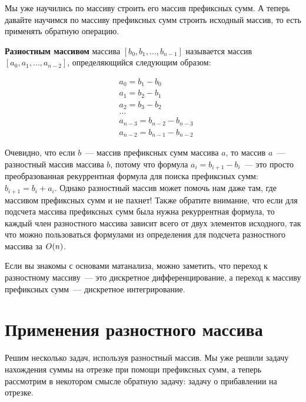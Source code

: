 Мы уже научились по массиву строить его массив префиксных сумм. А теперь давайте научимся по массиву префиксных сумм строить исходный массив, то есть применять обратную операцию.

\begin{definition}
    \textbf{Разностным массивом} массива $[b_0, b_1, \ldots, b_{n - 1}]$ называется массив $[a_0, a_1, \ldots, a_{n - 2}]$, определяющийся следующим образом:

\begin{align*}
&   a_0 = b_1 - b_0\\
&   a_1 = b_2 - b_1\\
&   a_2 = b_3 - b_2\\
&   \ldots\\
&   a_{n - 3} = b_{n - 2} - b_{n - 3}\\
&   a_{n - 2} = b_{n - 1} - b_{n - 2}
\end{align*}
\end{definition}

Очевидно, что если $b$~--- массив префиксных сумм массива $a$, то массив $a$~--- разностный массив массива $b$, потому что формула $a_i = b_{i + 1} - b_i$~--- это просто преобразованная рекуррентная формула для поиска префиксных сумм: $b_{i + 1} = b_i + a_i$.
Однако разностный массив может помочь нам даже там, где массивом префиксных сумм и не пахнет!
Также обратите внимание, что если для подсчета массива префиксных сумм была нужна рекуррентная формула, то каждый член разностного массива зависит всего от двух элементов исходного, так что можно пользоваться формулами из определения для подсчета разностного массива за $O(n)$.


\begin{observation}
    Если вы знакомы с основами матанализа, можно заметить, что переход к разностному массиву~--- это дискретное дифференцирование, а переход к массиву префиксных сумм~--- дискретное интегрирование.
\end{observation}


\section{Применения разностного массива}

Решим несколько задач, используя разностный массив. Мы уже решили задачу нахождения суммы на отрезке при помощи префиксных сумм, а теперь рассмотрим в некотором смысле обратную задачу: задачу о прибавлении на отрезке.

